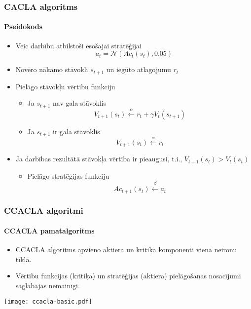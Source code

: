 \documentclass[xetex,mathserif]{beamer}
\begin{document}
  \begin{frame}
    \frametitle{CACLA algoritms}
    \framesubtitle{Pseidokods}
    \begin{itemize}
      \item Veic darbību atbilstoši esošajai stratēģijai
        \begin{equation*}
          a_t = \mathcal{N}\left(Ac_t(s_t), 0.05\right)
        \end{equation*}
      \item Novēro nākamo stāvokli $s_{t+1}$ un iegūto atlagojumu $r_{t}$
      \item Pielāgo stāvokļu vērtību funkciju
        \begin{itemize}
          \item Ja $s_{t+1}$ nav gala stāvoklis
            \begin{equation*}
              V_{t+1}(s_t) \xleftarrow{\alpha} r_t + \gamma V_t(s_{t + 1})
            \end{equation*}
          \item Ja $s_{t+1}$ ir gala stāvoklis
            \begin{equation*}
              V_{t+1}(s_t) \xleftarrow{\alpha} r_t
            \end{equation*}
        \end{itemize}
      \item Ja darbības rezultātā stāvokļa vērtība ir pieaugusi, t.i., $V_{t+1}(s_t)
        > V_t(s_t)$
        \begin{itemize}
          \item Pielāgo stratēģijas funkciju
            \begin{equation*}
              Ac_{t+1}(s_t) \xleftarrow{\beta} a_t
            \end{equation*}
        \end{itemize}
    \end{itemize}
  \end{frame}

  \begin{frame}
    \frametitle{CCACLA algoritmi}
    \framesubtitle{CCACLA pamatalgoritms}
    \begin{itemize}
      \item CCACLA algoritms apvieno aktiera un kritiķa komponenti vienā neironu
        tīklā.
      \item Vērtību funkcijas (kritiķa) un stratēģijas (aktiera) pielāgošanas
        nosacījumi saglabājas nemainīgi.
    \end{itemize}
    \begin{center}
      \hspace{2cm} \texttt{[image: ccacla-basic.pdf]}
    \end{center}
  \end{frame}
\end{document}
